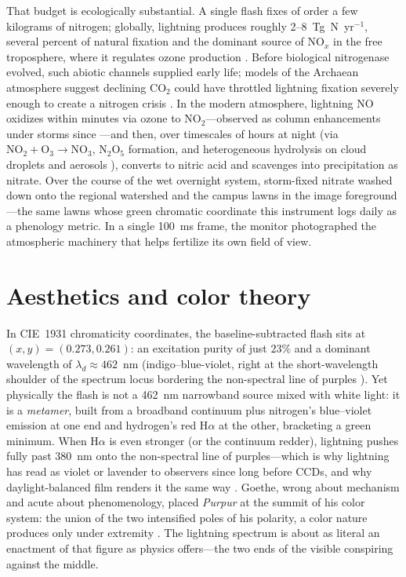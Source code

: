 \documentclass[11pt,a4paper]{article}
\begin{document}
That budget is ecologically substantial. A single flash fixes of order a few
kilograms of nitrogen; globally, lightning produces roughly
2--8~Tg~N~yr$^{-1}$, several percent of natural fixation and the dominant
source of NO$_x$ in the free troposphere, where it regulates ozone production
\citep{borucki1984,schumann2007}. Before biological nitrogenase evolved, such
abiotic channels supplied early life; models of the Archaean atmosphere
suggest declining CO$_2$ could have throttled lightning fixation severely
enough to create a nitrogen crisis \citep{navarrogonzalez2001}. In the
modern atmosphere, lightning NO oxidizes within minutes via ozone to
NO$_2$---observed as column enhancements under storms since
\citet{noxon1976}---and then, over timescales of hours at night (via
$\mathrm{NO_2 + O_3 \to NO_3}$, $\mathrm{N_2O_5}$ formation, and heterogeneous
hydrolysis on cloud droplets and aerosols \cite{seinfeld2016}), converts to
nitric acid and scavenges into precipitation as nitrate. Over the course of
the wet overnight system, storm-fixed nitrate washed down onto the regional
watershed and the campus lawns in the image foreground---the same lawns whose
green chromatic coordinate this instrument logs daily as a phenology metric.
In a single 100~ms frame, the monitor photographed the atmospheric machinery
that helps fertilize its own field of view.

\section{Aesthetics and color theory}
In CIE~1931 chromaticity coordinates, the baseline-subtracted flash sits at
$(x,y)=(0.273,0.261)$: an excitation purity of just $23\%$ and a dominant
wavelength of $\lambda_d\approx 462$~nm (indigo--blue-violet, right at the
short-wavelength shoulder of the spectrum locus bordering the non-spectral
line of purples \cite{wyszecki1982}). Yet physically the flash is not a
462~nm narrowband source mixed with white light: it is a \emph{metamer},
built from a broadband continuum plus nitrogen's blue--violet emission at one
end and hydrogen's red H$\alpha$ at the other, bracketing a green minimum.
When H$\alpha$ is even stronger (or the continuum redder), lightning pushes
fully past 380~nm onto the non-spectral line of purples---which is why
lightning has read as violet or lavender to observers since long before CCDs,
and why daylight-balanced film renders it the same way
\citep{minnaert1954,salanave1961}. Goethe, wrong about mechanism and acute
about phenomenology, placed \emph{Purpur} at the summit of his color system:
the union of the two intensified poles of his polarity, a color nature
produces only under extremity \citep{goethe1810}. The lightning spectrum is
about as literal an enactment of that figure as physics offers---the two ends
of the visible conspiring against the middle.
\end{document}
